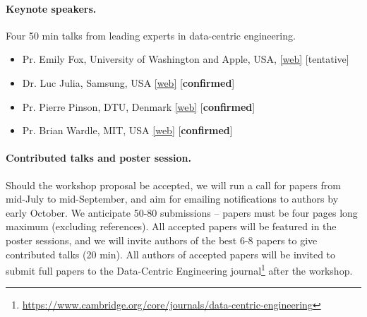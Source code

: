 \documentclass[11pt,a4paper]{scrartcl}
\theoremstyle{plain}  %
\begin{document}
\paragraph{Keynote speakers.} Four 50 min talks from leading experts in data-centric engineering.
\begin{itemize}
  \item Pr. Emily Fox, University of Washington and Apple, USA, \href{https://homes.cs.washington.edu/~ebfox/}{[web]} [tentative]
  \item Dr. Luc Julia, Samsung, USA \href{http://lucjulia.com}{[web]} [\textbf{confirmed}]
  \item Pr. Pierre Pinson, DTU, Denmark \href{https://orbit.dtu.dk/en/persons/pierre-pinson}{[web]} [\textbf{confirmed}]
  \item Pr. Brian Wardle, MIT, USA \href{https://aeroastro.mit.edu/faculty-research/faculty-list/brian-l-wardle}{[web]} [\textbf{confirmed}]
\end{itemize}

\paragraph{Contributed talks and poster session.} Should the workshop proposal be accepted, we will run a call for papers from mid-July to mid-September, and aim for emailing notifications to authors by early October. We anticipate 50-80 submissions -- papers must be four pages long maximum (excluding references). All accepted papers will be featured in the poster sessions, and we will invite authors of the best 6-8 papers to give contributed talks (20 min). All authors of accepted papers will be invited to submit full papers to the Data-Centric Engineering journal\footnote{\url{https://www.cambridge.org/core/journals/data-centric-engineering}} after the workshop.
\end{document}
